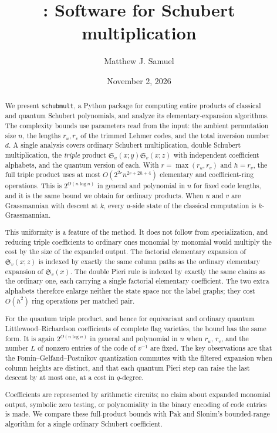 \documentclass{amsart}
\title[\alg: Schubert multiplication]{\alg: Software for Schubert multiplication}
\author{Matthew J. Samuel}
\date{November 2, 2026}
\theoremstyle{definition}
\theoremstyle{remark}
\numberwithin{equation}{section}
\newcommand{\Sch}{\mathfrak S}
\newcommand{\alg}{\texttt{schubmult}}
\begin{document}
\begin{abstract}
We present \alg, a Python package for computing entire products of
classical and quantum Schubert polynomials, and analyze its
elementary-expansion algorithms. The complexity bounds use parameters
read from the input: the ambient permutation size $n$, the lengths
$r_u,r_v$ of the trimmed Lehmer codes, and the total inversion number $d$.
A single analysis covers ordinary Schubert multiplication, double
Schubert multiplication, the \emph{triple} product
$\Sch_u(x;y)\Sch_v(x;z)$ with independent coefficient alphabets, and
the quantum version of each.
With $r=\max(r_u,r_v)$ and $h=r_v$, the full triple product uses at most
$O(2^{2r}n^{2r+2h+4})$ elementary and coefficient-ring operations.
This is $2^{O(n\log n)}$ in general and polynomial in $n$ for fixed code
lengths, and it is the same bound we obtain for ordinary products.
When $u$ and $v$ are Grassmannian with descent at $k$, every $u$-side
state of the classical computation is $k$-Grassmannian.

This uniformity is a feature of the method.
It does not follow from specialization, and reducing triple
coefficients to ordinary ones monomial by monomial would multiply the
cost by the size of the expanded output.
The factorial elementary expansion of $\Sch_v(x;z)$ is indexed by
exactly the same column paths as the ordinary elementary expansion of
$\Sch_v(x)$.
The double Pieri rule is indexed by exactly the same chains as the
ordinary one, each carrying a single factorial elementary coefficient.
The two extra alphabets therefore enlarge neither the state space nor
the label graphs; they cost $O(h^2)$ ring operations per matched pair.

For the quantum triple product, and hence for equivariant and ordinary
quantum Littlewood--Richardson coefficients of complete flag varieties,
the bound has the same form. It is again $2^{O(n\log n)}$ in general and
polynomial in $n$ when $r_u$, $r_v$, and the number $L$ of nonzero
entries of the code of $v^{-1}$ are fixed.
The key observations are that the Fomin--Gelfand--Postnikov quantization
commutes with the filtered expansion when column heights are distinct,
and that each quantum Pieri step can raise the last descent by at most
one, at a cost in $q$-degree.

Coefficients are represented by arithmetic circuits; no claim about
expanded monomial output, symbolic zero testing, or polynomiality in
the binary encoding of code entries is made.
We compare these full-product bounds with Pak and Slonim's
bounded-range algorithm for a single ordinary Schubert coefficient.
\end{abstract}
\maketitle
\end{document}
